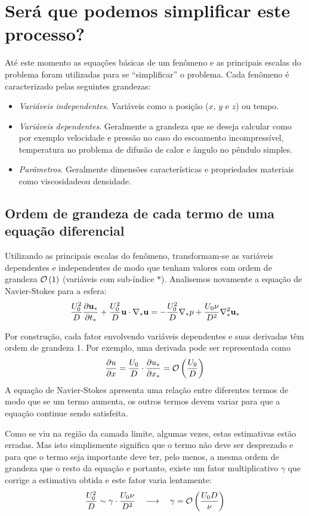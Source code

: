 \chapter{Será que podemos simplificar este processo?}

Até este momento as equações básicas de um fenômeno e as principais escalas do problema foram utilizadas para se ``simplificar'' o problema. Cada fenômeno é caracterizado pelas seguintes grandezas:
\begin{itemize}
\item \emph{Variáveis independentes}. Variáveis como a posição ($x$, $y$ e $z$) ou tempo.
\item \emph{Variáveis dependentes}. Geralmente a grandeza que se deseja calcular como por exemplo velocidade e pressão no caso do escoamento incompressível, temperatura no problema de difusão de calor e ângulo no pêndulo simples.
\item \emph{Parâmetros}. Geralmente dimensões características e propriedades materiais como viscosidadeou densidade. 
\end{itemize}

\section{Ordem de grandeza de cada termo de uma equação diferencial}
Utilizando as principais escalas do fenômeno, transformam-se as variáveis dependentes e independentes de modo que tenham valores com ordem de grandeza $\mathcal{O}\left(1\right)$ (variáveis com sub-índice $*$). Analisemos novamente a equação de Navier-Stokes para a esfera:
\begin{equation}
\frac{U_0^2}{D}\frac{\partial \mathbf{u_*}}{\partial t_*} + \frac{U_0^2}{D} \mathbf{u}\cdot\nabla_* \mathbf{u} = -\frac{U_0^2}{D}\nabla_* p + \frac{U_0\nu}{D^2}\nabla_*^2 \mathbf{u_*} 
\label{eq:ns2}
\end{equation}

Por construção, cada fator envolvendo variáveis dependentes e suas derivadas têm ordem de grandeza 1. Por exemplo, uma derivada pode ser representada como 
\[
\frac{\partial u}{\partial x} = \frac{U_0}{D}\cdot\frac{\partial u_*}{\partial x_*} = \mathcal{O}\left(\frac{U_0}{D}\right)
\]
A equação de Navier-Stokes apresenta uma relação entre diferentes termos de modo que se um termo aumenta, os outros termos devem variar para que a equação continue sendo satisfeita.

Como se viu na região da camada limite, algumas vezes, estas estimativas estão erradas. Mas isto simplismente significa que o termo não deve ser desprezado e para que o termo seja importante deve ter, pelo menos, a mesma ordem de grandeza que o resto da equação e portanto, existe um fator multiplicativo $\gamma$ que corrige a estimativa obtida e este fator varia lentamente:
\[
\frac{U_0^2}{D} \sim \gamma \cdot \frac{U_0\nu}{D^2} \quad\longrightarrow\quad \gamma = \mathcal{O}\left(\frac{U_0 D}{\nu}\right)
\]

